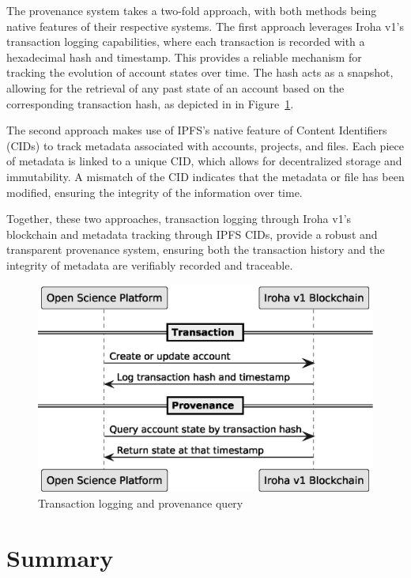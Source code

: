 \documentclass[final]{rc-book-2.14}
\begin{document}
The provenance system takes a two-fold approach, with both methods being native features of their respective systems. The first approach leverages Iroha v1’s transaction logging capabilities, where each transaction is recorded with a hexadecimal hash and timestamp. This provides a reliable mechanism for tracking the evolution of account states over time. The hash acts as a snapshot, allowing for the retrieval of any past state of an account based on the corresponding transaction hash, as depicted in in Figure~\ref{fig:provenance}.

The second approach makes use of IPFS’s native feature of Content Identifiers (CIDs) to track metadata associated with accounts, projects, and files. Each piece of metadata is linked to a unique CID, which allows for decentralized storage and immutability. A mismatch of the CID indicates that the metadata or file has been modified, ensuring the integrity of the information over time.

Together, these two approaches, transaction logging through Iroha v1’s blockchain and metadata tracking through IPFS CIDs, provide a robust and transparent provenance system, ensuring both the transaction history and the integrity of metadata are verifiably recorded and traceable.


\begin{figure}[htbp]
    \centering
    \includegraphics[scale=0.5]{fig/provenance_timeline.eps}
    \caption{Transaction logging and provenance query}
    \label{fig:provenance}
\end{figure}


\section{Summary}
\label{chp:proposed_model:sec:summary}
\end{document}
